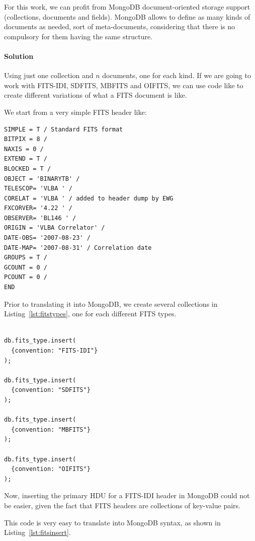 For this work, we can profit from MongoDB document-oriented storage support (collections, documents and fields). MongoDB allows to define as
many %
kinds of documents as needed, sort of meta-documents, considering that there is no compulsory for them having the same structure. 

\paragraph{Solution}

Using just one collection and $n$ documents, one for each kind. If we are going to work with FITS-IDI, SDFITS, MBFITS and OIFITS, we can use code like to create different variations of what a FITS document is like.

We start from a very simple FITS header like: 

\begin{lstlisting}[float,label=lst:fitsheader,caption=FITS sample.]
SIMPLE = T / Standard FITS format
BITPIX = 8 /
NAXIS = 0 /
EXTEND = T /
BLOCKED = T /
OBJECT = 'BINARYTB' /
TELESCOP= 'VLBA ' /
CORELAT = 'VLBA ' / added to header dump by EWG
FXCORVER= '4.22 ' /
OBSERVER= 'BL146 ' /
ORIGIN = 'VLBA Correlator' /
DATE-OBS= '2007-08-23' /
DATE-MAP= '2007-08-31' / Correlation date
GROUPS = T /
GCOUNT = 0 /
PCOUNT = 0 /
END
\end{lstlisting}

Prior to translating it into MongoDB, we create several collections in Listing~\ref{lst:fitstypes}, one for each different FITS types.

\begin{lstlisting}[float,label=lst:fitstypes,caption=MongoDB BSON code for creating the different FITS document types.]

db.fits_type.insert(
  {convention: "FITS-IDI"}
);

db.fits_type.insert(
  {convention: "SDFITS"}
);

db.fits_type.insert(
  {convention: "MBFITS"}
);

db.fits_type.insert(
  {convention: "OIFITS"}
);

\end{lstlisting}


Now, inserting the primary HDU for a  FITS-IDI header in MongoDB could not be
easier, given the fact that FITS headers are collections of key-value pairs. %

This code is very easy to translate into MongoDB syntax, as shown in Listing~\ref{lst:fitsinsert}.

